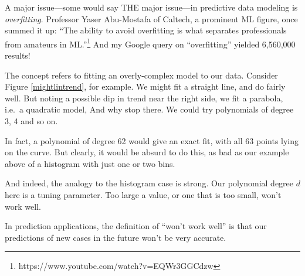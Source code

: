 A major issue---some would say THE major issue---in predictive
data modeling is \textit{overfitting}.  Professor Yaser
Abu-Mostafa of Caltech, a prominent ML figure, once summed it up: ``The
ability to avoid overfitting is what separates professionals from
amateurs in ML.''\footnote{https://www.youtube.com/watch?v=EQWr3GGCdzw}
And my Google query on ``overfitting'' yielded 6,560,000 results!

The concept refers to fitting an overly-complex model to our data.
Consider Figure \ref{mightlintrend}, for example.  We might fit a
straight line, and do fairly well.  But noting a possible dip in trend
near the right side, we fit a parabola, i.e.\  a quadratic model,  And
why stop there.  We could try polynomials of degree 3, 4 and so on.

In fact, a polynomial of degree 62 would give an exact fit, with all 63
points lying on the curve.  But clearly, it would be absurd to do this,
as bad as our example above of a histogram with just one or two bins.

And indeed, the analogy to the histogram case is strong.  Our polynomial
degree $d$ here is a tuning parameter.  Too large a value, or one that
is too small, won't work well.

In prediction applications, the definition of ``won't work well'' is
that our predictions of new cases in the future won't be very accurate.

